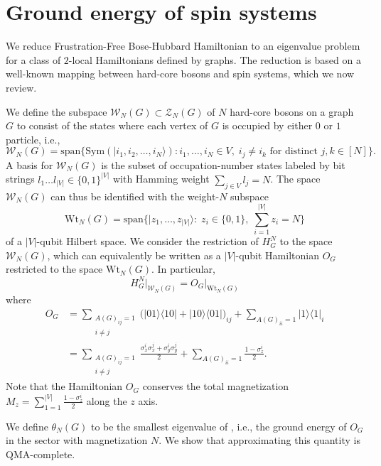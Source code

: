 \documentclass[../thesis-main/thesis-main]{subfiles}
\begin{document}
\chapter{Ground energy of spin systems}

We reduce Frustration-Free Bose-Hubbard Hamiltonian to an eigenvalue problem for a class of $2$-local Hamiltonians defined by graphs. The reduction is based on a well-known mapping between hard-core bosons and spin systems, which we now review.

We define the subspace $\mathcal{W}_N(G)\subset \mathcal{Z}_N (G)$ of $N$ hard-core bosons on a graph $G$ to consist of the states where each vertex of $G$ is occupied by either $0$ or $1$ particle, i.e., 
\[
  \mathcal{W}_N(G)=\text{span}\{\text{Sym}(|i_1,i_2,\ldots,i_N\rangle) \colon
  i_1,\ldots,i_N\in V,\; i_j\neq i_k \text{ for distinct } j,k\in[N] \}.
\]
A basis for $\mathcal{W}_N(G)$ is the subset of occupation-number states  labeled by bit strings $l_1\ldots l_{|V|}\in \{0,1\}^{|V|}$ with Hamming weight $\sum_{j\in V}l_j=N$.  The space $\mathcal{W}_N(G)$ can thus be identified with the weight-$N$ subspace
\[
\text{Wt}_N(G)=\text{span}\{|z_1,\ldots, z_{|V|}\rangle:\; z_i\in\{0,1\},\; \sum_{i=1}^{|V|} z_i =N\}
\]
of a $|V|$-qubit Hilbert space. We consider the restriction of $H_G^N$ to the space $\mathcal{W}_N(G)$, which can equivalently be written as a $|V|$-qubit Hamiltonian $O_G$ restricted to the space $\text{Wt}_N(G)$.  In particular,
\begin{equation}
H_G^N\big|_{\mathcal{W}_N(G)}=O_G\big|_{\text{Wt}_N(G)}
\label{eq:restriction_equality}
\end{equation}
where 
\begin{align*}
O_G & = \sum_{\substack{A(G)_{ij}=1 \\ i\neq j}}\big(|01\rangle\langle 10|+|10\rangle\langle 01|\big)_{ij} +\sum_{A(G)_{ii}=1} |1\rangle\langle1|_i\\
&=\sum_{\substack{A(G)_{ij}=1 \\ i\neq j}}\frac{\sigma_x^i \sigma_x^j+\sigma_y^i \sigma_y^j}{2}+\sum_{A(G)_{ii}=1}\frac{1-\sigma_z^{i}}{2}.
\end{align*}
Note that the Hamiltonian $O_G$ conserves the total magnetization $M_z=\sum_{1=1}^{|V|}\frac{1-\sigma_z^{i}}{2}$ along the $z$ axis. 

We define $\theta_N(G)$ to be the smallest eigenvalue of , i.e., the ground energy of $O_G$ in the sector with magnetization $N$. We show that approximating this quantity is QMA-complete.
\end{document}
